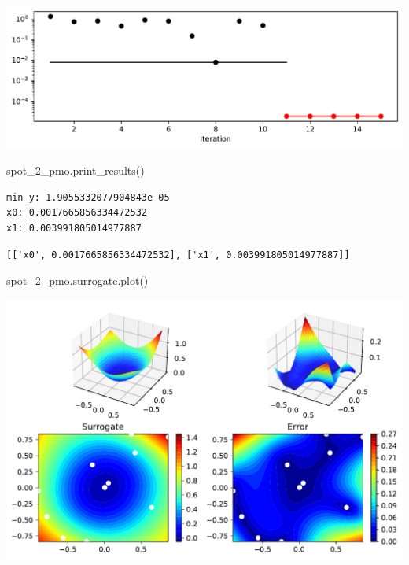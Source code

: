 \documentclass[
  letterpaper,
  DIV=11,
  numbers=noendperiod]{scrreprt}
\newenvironment{Shaded}{\begin{snugshade}}{\end{snugshade}}
\newcommand{\NormalTok}[1]{\textcolor[rgb]{0.00,0.23,0.31}{#1}}
\begin{document}
\includegraphics{015_num_spot_correlation_p_files/figure-pdf/cell-21-output-1.pdf}

\begin{Shaded}
\begin{Highlighting}[]
\NormalTok{spot\_2\_pmo.print\_results()}
\end{Highlighting}
\end{Shaded}

\begin{verbatim}
min y: 1.9055332077904843e-05
x0: 0.0017665856334472532
x1: 0.003991805014977887
\end{verbatim}

\begin{verbatim}
[['x0', 0.0017665856334472532], ['x1', 0.003991805014977887]]
\end{verbatim}

\begin{Shaded}
\begin{Highlighting}[]
\NormalTok{spot\_2\_pmo.surrogate.plot()}
\end{Highlighting}
\end{Shaded}

\includegraphics{015_num_spot_correlation_p_files/figure-pdf/cell-23-output-1.pdf}
\end{document}
